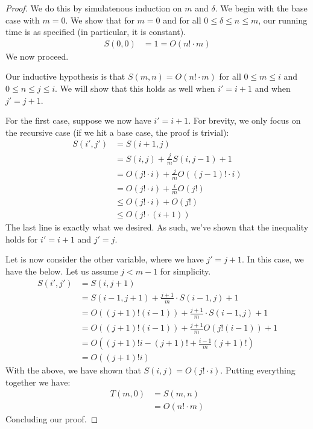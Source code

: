\documentclass[12pt]{exam}
\begin{document}
\begin{questions}
\begin{solution}
\begin{enumerate}[label=(\alph*)]
\begin{proof}
        We do this by simulatenous induction on $m$ and $\delta$. We begin with the base case with $m = 0$. We show that for $m = 0$ and for all $ 0 \leq \delta \leq n \leq m$, our running time is as specified (in particular, it is constant).
        \begin{align*}
          S(0,0) &= 1 = O(n! \cdot m)
        \end{align*}
        We now proceed.


        Our inductive hypothesis is that $S(m,n) = O(n! \cdot m)$ for all $0 \leq m \leq i$ and $0 \leq n \leq j \leq i$. We will show that this holds as well when $i' = i + 1$ and when $j' = j + 1$.

        For the first case, suppose we now have $i' = i + 1$. For brevity, we only focus on the recursive case (if we hit a base case, the proof is trivial):
        \begin{align*}
          S(i', j') &= S(i + 1, j) \\
          &= S(i, j) + \frac{j}{m} S(i, j - 1) + 1 \tag{By definition} \\
          &= O(j! \cdot i) + \frac{j}{m}O((j-1)! \cdot i ) \tag{By inductive hypothesis} \\
          &= O(j! \cdot i) + \frac{i}{m}O(j!) \tag{Associativity} \\
          &\leq O(j! \cdot i) + O(j!) \tag{$i \leq m$} \\
          &\leq O(j!\cdot (i + 1))
        \end{align*}
        The last line is exactly what we desired. As such, we've shown that the inequality holds for $i' = i + 1$ and $j' = j$.

        Let is now consider the other variable, where we have $j' = j + 1$. In this case, we have the below. Let us assume $j < m -1$ for simplicity.
        \begin{align*}
          S(i', j') &= S(i, j + 1) \\
          &= S(i - 1, j + 1) + \frac{j + 1}{m} \cdot S(i - 1, j) + 1 \tag{Definition} \\
          &= O\left((j+1)! (i-1)\right) + \frac{j + 1}{m} \cdot S(i - 1, j) + 1 \tag{By initial inductive hypothesis} \\
          &= O\left((j+1)! (i-1)\right) + \frac{j + 1}{m} O(j!(i-1)) + 1 \tag{By result proved just above} \\
          &= O \left( (j+1)!i - (j+1)! + \frac{i-1}{m}(j+1)! \right) \tag{Expanding} \\
          &= O\left((j+1)!i\right) \tag{$i - 1 \leq m$}
        \end{align*}
        With the above, we have shown that $S(i,j) = O(j! \cdot i)$. Putting everything together we have:
        \begin{align*}
          T(m, 0) &= S(m,n) \tag{By change of variables} \\
          &= O(n! \cdot m)
        \end{align*}
        Concluding our proof.
      \end{proof} 


\end{enumerate}
\end{solution}
\end{questions}
\end{document}
